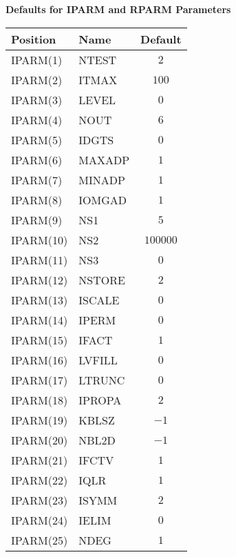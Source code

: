 \newpage
\begin{center}
{\bf Defaults for IPARM and RPARM Parameters}
\bigskip

\begin{tabular}{|l|l|c|}                    \hline
  Position   &   Name   &   Default \\     \hline
  IPARM(1)   &   NTEST  &     $2$   \\     \hline
  IPARM(2)   &   ITMAX  &    $100$  \\     \hline
  IPARM(3)   &   LEVEL  &     $0$   \\     \hline
  IPARM(4)   &   NOUT   &     $6$   \\     \hline
  IPARM(5)   &   IDGTS  &     $0$   \\     \hline
  IPARM(6)   &   MAXADP &     $1$   \\     \hline
  IPARM(7)   &   MINADP &     $1$   \\     \hline
  IPARM(8)   &   IOMGAD &     $1$   \\     \hline
  IPARM(9)   &   NS1    &     $5$   \\     \hline
  IPARM(10)  &   NS2    &  $100000$ \\     \hline
  IPARM(11)  &   NS3    &     $0$   \\     \hline
  IPARM(12)  &   NSTORE &     $2$   \\     \hline
  IPARM(13)  &   ISCALE &     $0$   \\     \hline
  IPARM(14)  &   IPERM  &     $0$   \\     \hline
  IPARM(15)  &   IFACT  &     $1$   \\     \hline
  IPARM(16)  &   LVFILL &     $0$   \\     \hline
  IPARM(17)  &   LTRUNC &     $0$   \\     \hline
  IPARM(18)  &   IPROPA &     $2$   \\     \hline
  IPARM(19)  &   KBLSZ  &    $-1$   \\     \hline
  IPARM(20)  &   NBL2D  &    $-1$   \\     \hline
  IPARM(21)  &   IFCTV  &     $1$   \\     \hline
  IPARM(22)  &   IQLR   &     $1$   \\     \hline
  IPARM(23)  &   ISYMM  &     $2$   \\     \hline
  IPARM(24)  &   IELIM  &     $0$   \\     \hline
  IPARM(25)  &   NDEG   &     $1$   \\     \hline
\end{tabular}  \hspace*{0.5in}

\end{center}
